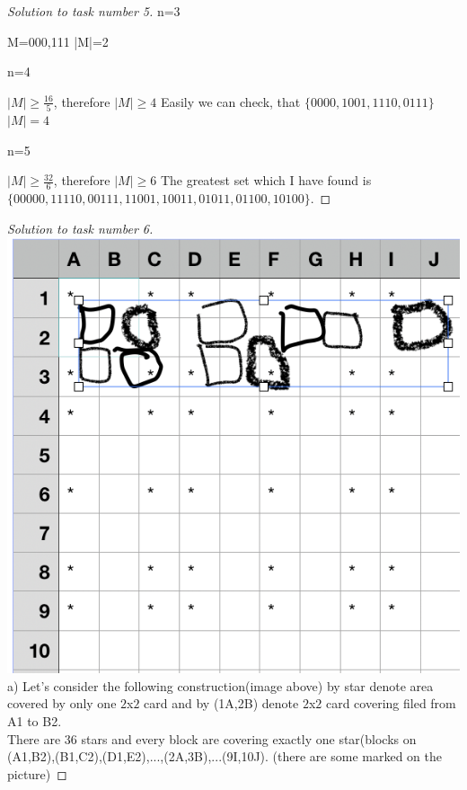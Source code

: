 \documentclass[12pt,a4paper]{article}
\begin{document}
\begin{proof}[Solution to task number 5]
n=3

M={000,111} |M|=2

n=4

$|M|\geq\frac{16}{5}$, therefore $|M|\geq 4$
Easily we can check, that  $\{0000,1001,1110,0111\}$  $|M|=4$

n=5

$|M|\geq\frac{32}{6}$, therefore $|M|\geq 6$
The greatest set which I have found  is \\
$\{00000,11110,00111,11001,10011,01011,01100,10100\}$.
\end{proof}
\vspace{1cm}
\begin{proof}[Solution to task number 6]
\
\\
\includegraphics[scale=0.7]{kon1}\\
a) Let's consider the following construction(image above) by star denote area covered by only one $2$x$2$ card and by (1A,2B) denote $2$x$2$ card covering filed from A1 to B2.\\
 There are 36 stars and every block are covering exactly one star(blocks on\\ (A1,B2),(B1,C2),(D1,E2),...,(2A,3B),...(9I,10J). (there are some marked on the picture)
 

\end{proof}
\end{document}

